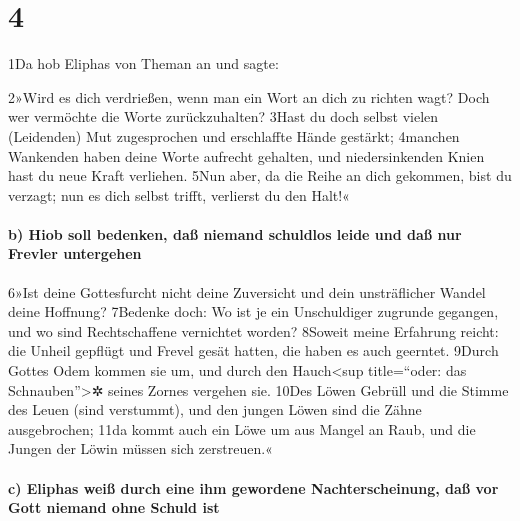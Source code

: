 \hypertarget{section-3}{%
\section{4}\label{section-3}}

1Da hob Eliphas von Theman an und sagte:

2»Wird es dich verdrießen, wenn man ein Wort an dich zu richten wagt?
Doch wer vermöchte die Worte zurückzuhalten? 3Hast du doch selbst vielen
(Leidenden) Mut zugesprochen und erschlaffte Hände gestärkt; 4manchen
Wankenden haben deine Worte aufrecht gehalten, und niedersinkenden Knien
hast du neue Kraft verliehen. 5Nun aber, da die Reihe an dich gekommen,
bist du verzagt; nun es dich selbst trifft, verlierst du den Halt!«

\hypertarget{b-hiob-soll-bedenken-dauxdf-niemand-schuldlos-leide-und-dauxdf-nur-frevler-untergehen}{%
\paragraph{b) Hiob soll bedenken, daß niemand schuldlos leide und daß
nur Frevler
untergehen}\label{b-hiob-soll-bedenken-dauxdf-niemand-schuldlos-leide-und-dauxdf-nur-frevler-untergehen}}

6»Ist deine Gottesfurcht nicht deine Zuversicht und dein unsträflicher
Wandel deine Hoffnung? 7Bedenke doch: Wo ist je ein Unschuldiger
zugrunde gegangen, und wo sind Rechtschaffene vernichtet worden? 8Soweit
meine Erfahrung reicht: die Unheil gepflügt und Frevel gesät hatten, die
haben es auch geerntet. 9Durch Gottes Odem kommen sie um, und durch den
Hauch\textless sup title=``oder: das Schnauben''\textgreater✲ seines
Zornes vergehen sie. 10Des Löwen Gebrüll und die Stimme des Leuen (sind
verstummt), und den jungen Löwen sind die Zähne ausgebrochen; 11da kommt
auch ein Löwe um aus Mangel an Raub, und die Jungen der Löwin müssen
sich zerstreuen.«

\hypertarget{c-eliphas-weiuxdf-durch-eine-ihm-gewordene-nachterscheinung-dauxdf-vor-gott-niemand-ohne-schuld-ist}{%
\paragraph{c) Eliphas weiß durch eine ihm gewordene Nachterscheinung,
daß vor Gott niemand ohne Schuld
ist}\label{c-eliphas-weiuxdf-durch-eine-ihm-gewordene-nachterscheinung-dauxdf-vor-gott-niemand-ohne-schuld-ist}}

